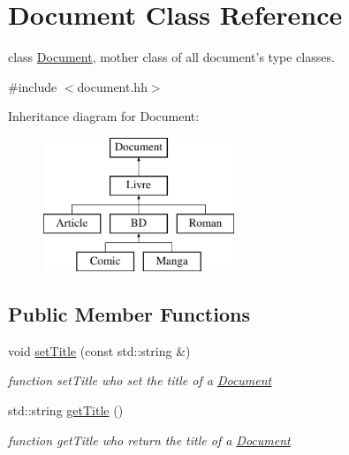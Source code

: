 \hypertarget{classDocument}{
\section{Document Class Reference}
\label{classDocument}
}


class \hyperlink{classDocument}{Document}, mother class of all document's type classes.  




{\ttfamily \#include $<$document.hh$>$}

Inheritance diagram for Document:\begin{figure}[H]
\begin{center}
\leavevmode
\includegraphics[height=4.000000cm]{classDocument}
\end{center}
\end{figure}
\subsection*{Public Member Functions}
\begin{DoxyCompactItemize}
\item 
\hypertarget{classDocument_a2be00cdaa69a39d54b5238211d0583de}{
void \hyperlink{classDocument_a2be00cdaa69a39d54b5238211d0583de}{setTitle} (const std::string \&)}
\label{classDocument_a2be00cdaa69a39d54b5238211d0583de}

\begin{DoxyCompactList}\small\item\em function setTitle who set the title of a \hyperlink{classDocument}{Document} \item\end{DoxyCompactList}\item 
\hypertarget{classDocument_a6f9dfdb78146953a8cead4c186dff027}{
std::string \hyperlink{classDocument_a6f9dfdb78146953a8cead4c186dff027}{getTitle} ()}
\label{classDocument_a6f9dfdb78146953a8cead4c186dff027}

\begin{DoxyCompactList}\small\item\em function getTitle who return the title of a \hyperlink{classDocument}{Document} \item\end{DoxyCompactList}\end{DoxyCompactItemize}
